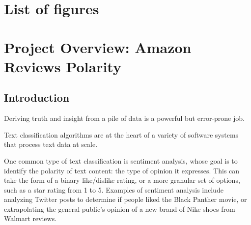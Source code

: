 \documentclass[
]{article}
\begin{document}
\renewcommand{\listtablename}{}

\listoftables
\clearpage

\newpage
\clearpage
{}

\hypertarget{list-of-figures}{%
\section*{List of figures}\label{list-of-figures}}

\renewcommand{\listfigurename}{}

\listoffigures
\clearpage

\newpage
\clearpage
{}
\newcommand{\listequationsname}{List of Equations}
\newcommand{\equations}[1]{%
\refstepcounter{equations}
\addcontentsline{equ}{equations}{ \protect\numberline{\theequations}#1}\par}

\renewcommand{\listequationsname}{}

\listofequations
\clearpage

\newpage


\newpage

\hypertarget{project-overview-amazon-reviews-polarity}{%
\section{Project Overview: Amazon Reviews
Polarity}\label{project-overview-amazon-reviews-polarity}}

\hypertarget{introduction}{%
\subsection{Introduction}\label{introduction}}

Deriving truth and insight from a pile of data is a powerful but
error-prone job.

Text classification algorithms are at the heart of a variety of software
systems that process text data at scale.

One common type of text classification is sentiment analysis, whose goal
is to identify the polarity of text content: the type of opinion it
expresses. This can take the form of a binary like/dislike rating, or a
more granular set of options, such as a star rating from 1 to 5.
Examples of sentiment analysis include analyzing Twitter posts to
determine if people liked the Black Panther movie, or extrapolating the
general public's opinion of a new brand of Nike shoes from Walmart
reviews.
\end{document}
